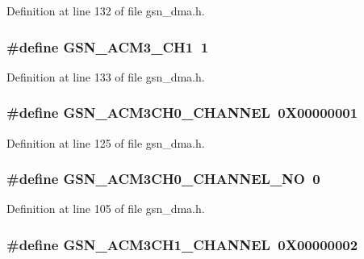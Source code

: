 Definition at line 132 of file gsn\_\-dma.h.

\hypertarget{a00484_ad60b99042fe6931090ef916ad0f64e35}{
\subsubsection[{GSN\_\-ACM3\_\-CH1}]{\setlength{\rightskip}{0pt plus 5cm}\#define GSN\_\-ACM3\_\-CH1~1}}
\label{a00484_ad60b99042fe6931090ef916ad0f64e35}


Definition at line 133 of file gsn\_\-dma.h.

\hypertarget{a00484_a5b2d635ead74aa250f85b2f594eee918}{
\subsubsection[{GSN\_\-ACM3CH0\_\-CHANNEL}]{\setlength{\rightskip}{0pt plus 5cm}\#define GSN\_\-ACM3CH0\_\-CHANNEL~0X00000001}}
\label{a00484_a5b2d635ead74aa250f85b2f594eee918}


Definition at line 125 of file gsn\_\-dma.h.

\hypertarget{a00484_aa2bd44137b5577f645382c31da5cabd2}{
\subsubsection[{GSN\_\-ACM3CH0\_\-CHANNEL\_\-NO}]{\setlength{\rightskip}{0pt plus 5cm}\#define GSN\_\-ACM3CH0\_\-CHANNEL\_\-NO~0}}
\label{a00484_aa2bd44137b5577f645382c31da5cabd2}


Definition at line 105 of file gsn\_\-dma.h.

\hypertarget{a00484_a3202cde71d55159ac4796ff71b45cfc6}{
\subsubsection[{GSN\_\-ACM3CH1\_\-CHANNEL}]{\setlength{\rightskip}{0pt plus 5cm}\#define GSN\_\-ACM3CH1\_\-CHANNEL~0X00000002}}
\label{a00484_a3202cde71d55159ac4796ff71b45cfc6}


